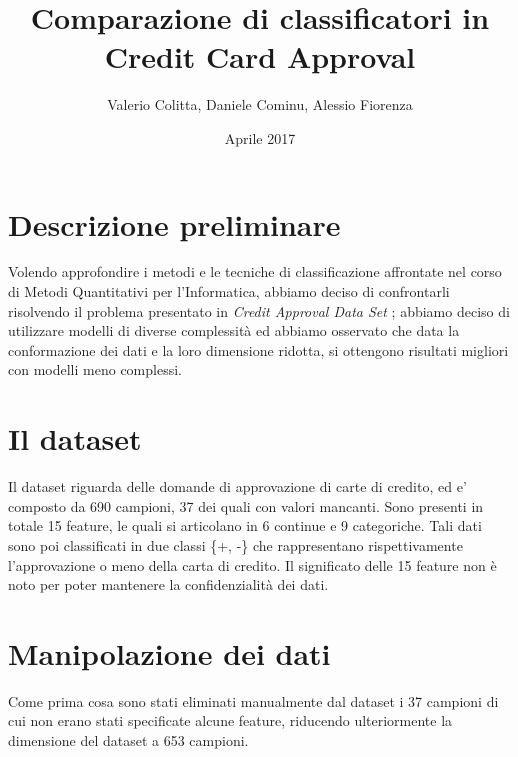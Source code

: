 \documentclass[a4paper,8pt]{article}
\begin{document}
\title{Comparazione di classificatori in Credit Card Approval}
\author{Valerio Colitta, Daniele Cominu, Alessio Fiorenza}
\date{Aprile 2017}
\maketitle


\begin{multicols}{2}

\section{Descrizione preliminare}
Volendo approfondire i metodi e le tecniche di classificazione affrontate nel corso di Metodi Quantitativi per l'Informatica, abbiamo deciso di confrontarli risolvendo il problema presentato in \emph{Credit Approval Data Set} \cite{Dataset}; abbiamo deciso di utilizzare modelli di diverse complessità ed abbiamo osservato che data la conformazione dei dati e la loro dimensione ridotta, si ottengono risultati migliori con modelli meno complessi. 

\section{Il dataset}
Il dataset riguarda delle domande di approvazione di carte di credito, ed e' composto da 690 campioni, 37 dei quali con valori mancanti. Sono presenti in totale 15 feature, le quali si articolano in 6 continue e 9 categoriche. Tali dati sono poi classificati in due classi \{+, -\} che rappresentano rispettivamente l'approvazione o meno della carta di credito.
Il significato delle 15 feature non è noto per poter mantenere la confidenzialità dei dati.

\section{Manipolazione dei dati}
Come prima cosa sono stati eliminati manualmente dal dataset i 37 campioni di cui non erano stati specificate alcune feature, riducendo ulteriormente la dimensione del dataset a 653 campioni.\\

\end{multicols}
\end{document}

